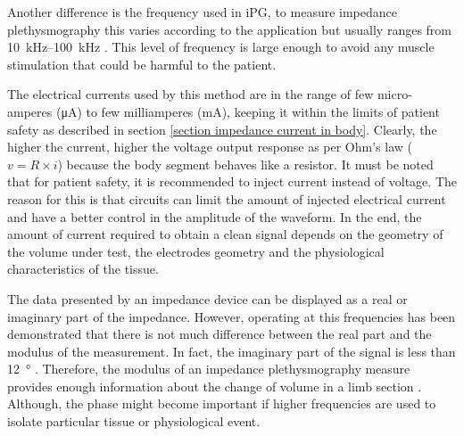 Another difference is the frequency used in iPG, to measure impedance plethysmography this varies according to the application but usually ranges from \SIrange{10}{100}{\kilo\hertz} \cite{songer2001tissue,casas1999vivo,kun1994tissue,ristic1997muscle}. This level of frequency is large enough to avoid any muscle stimulation that could be harmful to the patient. 

The electrical currents used by this method are in the range of few micro-amperes (\si{\micro\ampere}) to few milliamperes (\si{\milli\ampere}), keeping it within the limits of patient safety as described in section \ref{section impedance current in body}. Clearly, the higher the current, higher the voltage output response as per Ohm's law ($v = R \times i$) because the body segment behaves like a resistor. It must be noted that for patient safety, it is recommended to inject current instead of voltage. The reason for this is that circuits can limit the amount of injected electrical current and have a better control in the amplitude of the waveform. In the end, the amount of current required to obtain a clean signal depends on the geometry of the volume under test, the electrodes geometry and the physiological characteristics of the tissue. 

The data presented by an impedance device can be displayed as a real or imaginary part of the impedance. However, operating at this frequencies has been demonstrated that there is not much difference between the real part and the modulus of the measurement. In fact, the imaginary part of the signal is less than \SI{12}{\degree} \cite{jaffrin1979quantitative}. Therefore, the modulus of an impedance plethysmography measure provides enough information about the change of volume in a limb section \cite{anderson1984impedance}. Although, the phase might become important if higher frequencies are used to isolate particular tissue or physiological event.

